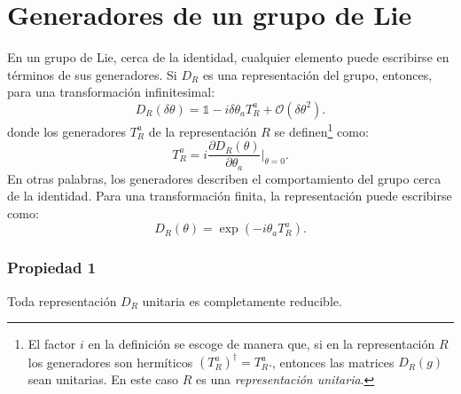 \documentclass[a4paper,11pt]{book} %
\begin{document}
\section{Generadores de un grupo de Lie}
\noindent
En un grupo de Lie, cerca de la identidad, cualquier elemento puede escribirse en
términos de sus generadores. Si \(D_R\) es una representación del grupo, entonces, para una transformación
infinitesimal:
\begin{equation}
    D_R(\delta\theta)
    =
    \mathds{1}
    -
    i\delta\theta_a T^a_R
    +
    \mathcal{O}(\delta\theta^2).
\end{equation}
\noindent
donde los generadores \(T^a_R\) de la representación \(R\) se definen\footnote{El factor $i$ en la
definición se escoge de manera que, si en la representación $R$ los
generadores son hermíticos $\left(T^a_R\right)^\dagger = T^a_R.$, entonces las matrices $D_R(g)$ sean unitarias.
En este caso $R$ es una \textit{representación unitaria}.} como:
\begin{equation}
    T^a_R
    =
    i
    \frac{\partial D_R(\theta)}
    {\partial \theta_a}
    \bigg|_{\theta=0}.
\end{equation}
\noindent
En otras palabras, los generadores describen el comportamiento del grupo cerca
de la identidad. Para una transformación finita, la representación puede
escribirse como:
\begin{equation}
    D_R(\theta)
    =
    \exp
    \left(
        -i\theta_a T^a_R
    \right).
\end{equation}
\subsubsection{Propiedad 1}
\noindent
Toda representación $D_R$ unitaria es completamente reducible.
\end{document}

